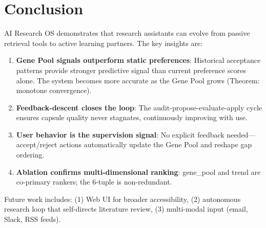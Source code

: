 \documentclass[anon,9pt]{article}
\begin{document}
\section{Conclusion}

AI Research OS demonstrates that research assistants can evolve from passive retrieval tools to active learning partners. The key insights are:

\begin{enumerate}
    \item \textbf{Gene Pool signals outperform static preferences}: Historical acceptance patterns provide stronger predictive signal than current preference scores alone. The system becomes more accurate as the Gene Pool grows (Theorem: monotone convergence).
    \item \textbf{Feedback-descent closes the loop}: The audit-propose-evaluate-apply cycle ensures capsule quality never stagnates, continuously improving with use.
    \item \textbf{User behavior is the supervision signal}: No explicit feedback needed---accept/reject actions automatically update the Gene Pool and reshape gap ordering.
    \item \textbf{Ablation confirms multi-dimensional ranking}: gene\_pool and trend are co-primary rankers; the 6-tuple is non-redundant.
\end{enumerate}

Future work includes: (1) Web UI for broader accessibility, (2) autonomous research loop that self-directs literature review, (3) multi-modal input (email, Slack, RSS feeds).



\end{document}
